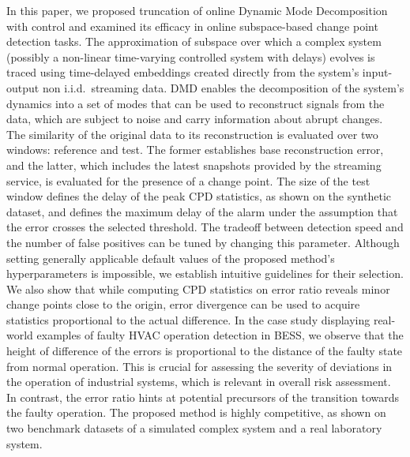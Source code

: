 In this paper, we proposed truncation of online Dynamic Mode Decomposition with control and examined its efficacy in online subspace-based change point detection tasks. The approximation of subspace over which a complex system (possibly a non-linear time-varying controlled system with delays) evolves is traced using time-delayed embeddings created directly from the system's input-output non i.i.d.~streaming data. DMD enables the decomposition of the system's dynamics into a set of modes that can be used to reconstruct signals from the data, which are subject to noise and carry information about abrupt changes. The similarity of the original data to its reconstruction is evaluated over two windows: reference and test. The former establishes base reconstruction error, and the latter, which includes the latest snapshots provided by the streaming service, is evaluated for the presence of a change point. The size of the test window defines the delay of the peak CPD statistics, as shown on the synthetic dataset, and defines the maximum delay of the alarm under the assumption that the error crosses the selected threshold. The tradeoff between detection speed and the number of false positives can be tuned by changing this parameter. Although setting generally applicable default values of the proposed method's hyperparameters is impossible, we establish intuitive guidelines for their selection. We also show that while computing CPD statistics on error ratio reveals minor change points close to the origin, error divergence can be used to acquire statistics proportional to the actual difference. In the case study displaying real-world examples of faulty HVAC operation detection in BESS, we observe that the height of difference of the errors is proportional to the distance of the faulty state from normal operation. This is crucial for assessing the severity of deviations in the operation of industrial systems, which is relevant in overall risk assessment. In contrast, the error ratio hints at potential precursors of the transition towards the faulty operation. The proposed method is highly competitive, as shown on two benchmark datasets of a simulated complex system and a real laboratory system.
